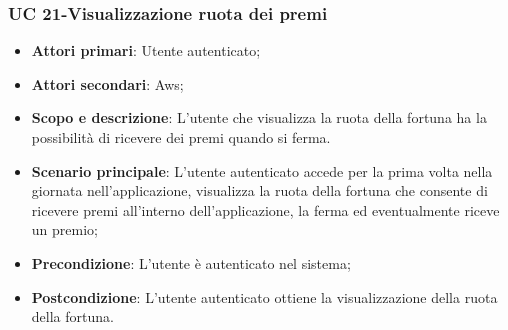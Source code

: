         \subsubsection{UC 21-Visualizzazione ruota dei premi}  
      \begin{itemize}
        \item \textbf{Attori primari}: Utente autenticato;
        \item \textbf{Attori secondari}: Aws;
        \item \textbf{Scopo e descrizione}: L'utente che visualizza la ruota della fortuna ha la possibilità di ricevere dei premi quando si ferma.
           
            
        \item \textbf{Scenario principale}: L'utente autenticato accede per la prima volta nella giornata nell'applicazione, visualizza la ruota della fortuna che consente di ricevere premi all'interno dell'applicazione, la ferma ed eventualmente riceve un premio;
        \item \textbf{Precondizione}: L'utente è autenticato nel sistema;
        \item \textbf{Postcondizione}: L'utente autenticato ottiene la visualizzazione della ruota della fortuna.
        \end{itemize}  
      
 
    
        
         
    
        
        
           
        
        
       

    
    
